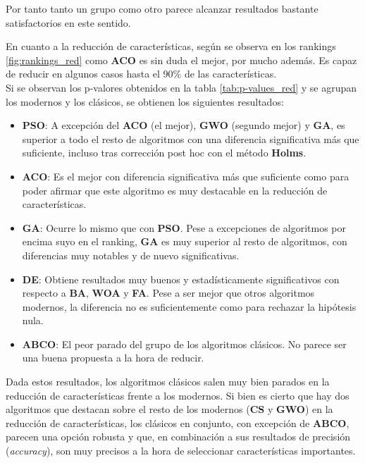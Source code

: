 Por tanto tanto un grupo como otro parece alcanzar resultados bastante satisfactorios en este sentido.

En cuanto a la reducción de características, según se observa en los rankings \ref{fig:rankings_red} como \textbf{ACO} es sin duda el mejor, por mucho además. Es capaz de reducir en algunos casos hasta el $90\%$ de las características.\\[6pt]
Si se observan los p-valores obtenidos en la tabla \ref{tab:p-values_red} y se agrupan los modernos y los clásicos, se obtienen los siguientes resultados:
\begin{itemize}
    \item \textbf{PSO}: A excepción del \textbf{ACO} (el mejor), \textbf{GWO} (segundo mejor) y \textbf{GA}, es superior a todo el resto de algoritmos con una diferencia significativa más que suficiente, incluso tras corrección post hoc con el método \textbf{Holms}.
    \item \textbf{ACO}: Es el mejor con diferencia significativa más que suficiente como para poder afirmar que este algoritmo es muy destacable en la reducción de características.
    \item \textbf{GA}: Ocurre lo mismo que con \textbf{PSO}. Pese a excepciones de algoritmos por encima suyo en el ranking, \textbf{GA} es muy superior al resto de algoritmos, con diferencias muy notables y de nuevo significativas.
    \item \textbf{DE}: Obtiene resultados muy buenos y estadísticamente significativos con respecto a \textbf{BA}, \textbf{WOA} y \textbf{FA}. Pese a ser mejor que otros algoritmos modernos, la diferencia no es suficientemente como para rechazar la hipótesis nula.
    \item \textbf{ABCO}: El peor parado del grupo de los algoritmos clásicos. No parece ser una buena propuesta a la hora de reducir.
\end{itemize}

Dada estos resultados, los algoritmos clásicos salen muy bien parados en la reducción de características frente a los modernos. Si bien es cierto que hay dos algoritmos que destacan sobre el resto de los modernos (\textbf{CS} y \textbf{GWO}) en la reducción de características, los clásicos en conjunto, con excepción de \textbf{ABCO}, parecen una opción robusta y que, en combinación a sus resultados de precisión (\textit{accuracy}), son muy precisos a la hora de seleccionar características importantes.

